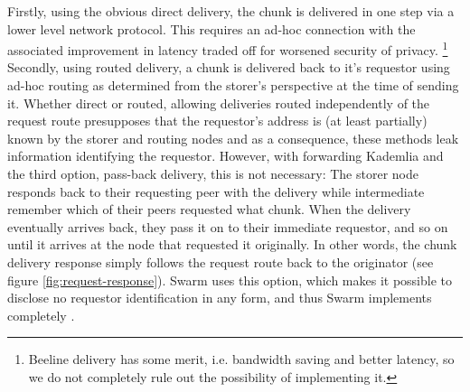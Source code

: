 Firstly, using the obvious direct delivery, the chunk is delivered in one step via a lower level network protocol. This requires an ad-hoc connection with the associated improvement in latency traded off for worsened security of privacy.%
%
\footnote{Beeline delivery has some merit, i.e. bandwidth saving and better latency, so we do not completely rule out the possibility of implementing it. 
}
Secondly, using routed delivery, a chunk is delivered back to it's requestor using ad-hoc routing as determined from the storer's perspective at the time of sending it. Whether direct or routed, allowing deliveries routed independently of the request route presupposes that the requestor's address is (at least partially) known by the storer and routing nodes and as a consequence, these methods leak information identifying the requestor. However, with forwarding Kademlia and the third option, pass-back delivery, this is not necessary: The storer node responds back to their requesting peer with the delivery while intermediate  remember which of their peers requested what chunk. When the delivery eventually arrives back, they pass it on to their immediate requestor, and so on until it arrives at the node that requested it originally. In other words, the chunk delivery response simply follows the request route back to the originator (see figure \ref{fig:request-response}). Swarm uses this option, which makes it possible to disclose no requestor identification in any form, and thus Swarm implements completely . 

